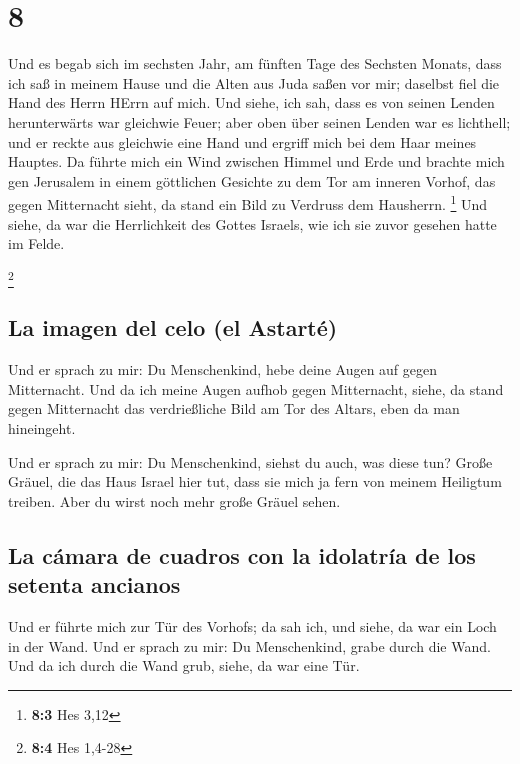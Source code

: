 \hypertarget{section-7}{%
\section{8}\label{section-7}}

 Und es begab sich im sechsten Jahr, am fünften Tage des
Sechsten Monats, dass ich saß in meinem Hause und die Alten aus Juda
saßen vor mir; daselbst fiel die Hand des Herrn HErrn auf mich.
 Und siehe, ich sah, dass es von seinen Lenden
herunterwärts war gleichwie Feuer; aber oben über seinen Lenden war es
lichthell;  und er reckte aus gleichwie eine Hand und
ergriff mich bei dem Haar meines Hauptes. Da führte mich ein Wind
zwischen Himmel und Erde und brachte mich gen Jerusalem in einem
göttlichen Gesichte zu dem Tor am inneren Vorhof, das gegen Mitternacht
sieht, da stand ein Bild zu Verdruss dem Hausherrn. \footnote{\textbf{8:3}
  Hes 3,12}  Und siehe, da war die Herrlichkeit des Gottes
Israels, wie ich sie zuvor gesehen hatte im Felde.

\footnote{\textbf{8:4} Hes 1,4-28}

\hypertarget{la-imagen-del-celo-el-astartuxe9}{%
\subsection{La imagen del celo (el
Astarté)}\label{la-imagen-del-celo-el-astartuxe9}}

 Und er sprach zu mir: Du Menschenkind, hebe deine Augen
auf gegen Mitternacht. Und da ich meine Augen aufhob gegen Mitternacht,
siehe, da stand gegen Mitternacht das verdrießliche Bild am Tor des
Altars, eben da man hineingeht.

 Und er sprach zu mir: Du Menschenkind, siehst du auch,
was diese tun? Große Gräuel, die das Haus Israel hier tut, dass sie mich
ja fern von meinem Heiligtum treiben. Aber du wirst noch mehr große
Gräuel sehen.

\hypertarget{la-cuxe1mara-de-cuadros-con-la-idolatruxeda-de-los-setenta-ancianos}{%
\subsection{La cámara de cuadros con la idolatría de los setenta
ancianos}\label{la-cuxe1mara-de-cuadros-con-la-idolatruxeda-de-los-setenta-ancianos}}

 Und er führte mich zur Tür des Vorhofs; da sah ich, und
siehe, da war ein Loch in der Wand.  Und er sprach zu mir:
Du Menschenkind, grabe durch die Wand. Und da ich durch die Wand grub,
siehe, da war eine Tür.

